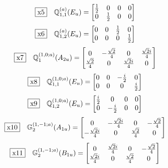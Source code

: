 \documentclass[fleqn,10pt,landscape]{jsarticle}
\begin{document}
\begin{dmath*}
\fbox{x5}\quad \mathbb{Q}_{1,1}^{(a)}(E_{u})=\begin{bmatrix} \frac{1}{2} & 0 & 0 & 0 \\ 0 & \frac{1}{2} & 0 & 0 \end{bmatrix}
\end{dmath*}
\begin{dmath*}
\fbox{x6}\quad \mathbb{Q}_{1,2}^{(a)}(E_{u})=\begin{bmatrix} 0 & 0 & \frac{1}{2} & 0 \\ 0 & 0 & 0 & \frac{1}{2} \end{bmatrix}
\end{dmath*}
\begin{dmath*}
\fbox{x7}\quad \mathbb{Q}_{1}^{(1,0;a)}(A_{2u})=\begin{bmatrix} 0 & - \frac{\sqrt{2}}{4} & 0 & \frac{\sqrt{2} i}{4} \\ \frac{\sqrt{2}}{4} & 0 & \frac{\sqrt{2} i}{4} & 0 \end{bmatrix}
\end{dmath*}
\begin{dmath*}
\fbox{x8}\quad \mathbb{Q}_{1,1}^{(1,0;a)}(E_{u})=\begin{bmatrix} 0 & 0 & - \frac{i}{2} & 0 \\ 0 & 0 & 0 & \frac{i}{2} \end{bmatrix}
\end{dmath*}
\begin{dmath*}
\fbox{x9}\quad \mathbb{Q}_{1,2}^{(1,0;a)}(E_{u})=\begin{bmatrix} \frac{i}{2} & 0 & 0 & 0 \\ 0 & - \frac{i}{2} & 0 & 0 \end{bmatrix}
\end{dmath*}
\begin{dmath*}
\fbox{x10}\quad \mathbb{G}_{2}^{(1,-1;a)}(A_{1u})=\begin{bmatrix} 0 & - \frac{\sqrt{2} i}{4} & 0 & - \frac{\sqrt{2}}{4} \\ - \frac{\sqrt{2} i}{4} & 0 & \frac{\sqrt{2}}{4} & 0 \end{bmatrix}
\end{dmath*}
\begin{dmath*}
\fbox{x11}\quad \mathbb{G}_{2}^{(1,-1;a)}(B_{1u})=\begin{bmatrix} 0 & \frac{\sqrt{2} i}{4} & 0 & - \frac{\sqrt{2}}{4} \\ \frac{\sqrt{2} i}{4} & 0 & \frac{\sqrt{2}}{4} & 0 \end{bmatrix}
\end{dmath*}
\end{document}
